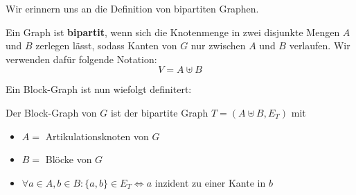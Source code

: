 \documentclass[a4paper]{report}
\begin{document}
Wir erinnern uns an die Definition von bipartiten Graphen.

\begin{tcolorbox}[colframe=dcBlue,title=Definition]
    Ein Graph ist \textbf{bipartit}, wenn sich die Knotenmenge in zwei disjunkte Mengen
    $A$ und $B$ zerlegen lässt, sodass Kanten von $G$ nur zwischen $A$ und $B$ verlaufen.
    Wir verwenden dafür folgende Notation:
    $$V = A \uplus B$$
\end{tcolorbox}
\bigskip

Ein Block-Graph ist nun wiefolgt definitert:

\begin{tcolorbox}[colframe=dcBlue,title=Definition]
    Der Block-Graph von $G$ ist der bipartite Graph $T = (A \uplus B, E_T )$ mit
    \begin{itemize}
        \item $A =$ {Artikulationsknoten von $G$}
        \item $B =$ {Blöcke von $G$}
        \item $\forall a \in A , b \in B: \{a,b\} \in E_T \Leftrightarrow a$ inzident zu einer Kante in $b$
    \end{itemize}
\end{tcolorbox}
\bigskip
\end{document}
